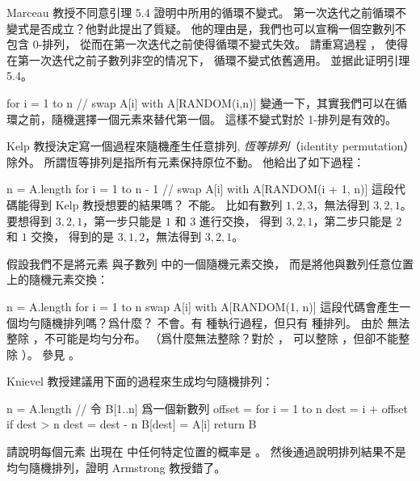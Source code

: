 \startsection[
  title={Randomized algorithms},
]

\startEXERCISE
Marceau 教授不同意引理 5.4 證明中所用的循環不變式。
第一次迭代之前循環不變式是否成立？他對此提出了質疑。
他的理由是，我們也可以宣稱一個空數列不包含 0-排列，
從而在第一次迭代之前使得循環不變式失效。
請重寫過程 ，
使得在第一次迭代之前子數列非空的情况下，
循環不變式依舊適用。
並据此证明引理 5.4。

\startCLRSCODE
for i = 1 to n
	// swap A[i] with A[RANDOM(i,n)]
\stopCLRSCODE
\stopEXERCISE
\startANSWER
變通一下，其實我們可以在循環之前，隨機選擇一個元素來替代第一個。
這樣不變式對於 1-排列是有效的。
\stopANSWER

\startEXERCISE
Kelp 教授決定寫一個過程來隨機產生任意排列,
\emph{恆等排列}（identity permutation）除外。
所謂恆等排列是指所有元素保持原位不動。
他給出了如下過程：

\startCLRSCODE
n = A.length
for i = 1 to n - 1
	// swap A[i] with A[RANDOM(i + 1, n)]
\stopCLRSCODE
這段代碼能得到 Kelp 教授想要的結果嗎？
\stopEXERCISE
\startANSWER
不能。
比如有數列 $1,2,3$，無法得到 $3,2,1$。
要想得到 $3,2,1$，第一步只能是 $1$ 和 $3$ 進行交換，
得到 $3,2,1$，第二步只能是 $2$ 和 $1$ 交換，
得到的是 $3,1,2$，無法得到 $3,2,1$。
\stopANSWER

\startEXERCISE
假設我們不是將元素  與子數列  中的一個隨機元素交換，
而是將他與數列任意位置上的隨機元素交換：

\startCLRSCODE
n = A.length
for i = 1 to n
	swap A[i] with A[RANDOM(1, n)]
\stopCLRSCODE
這段代碼會產生一個均勻隨機排列嗎？爲什麼？
\stopEXERCISE
\startANSWER
不會。有  種執行過程，但只有  種排列。
由於  無法整除 ，不可能是均勻分布。
（爲什麼無法整除？對於 ，  可以整除 ，但卻不能整除 ）。
參見 。
\stopANSWER

\startEXERCISE
Knievel 教授建議用下面的過程來生成均勻隨機排列：

\startCLRSCODE
n = A.length
// 令 B[1..n] 爲一個新數列
offset = 
for i = 1 to n
	dest = i + offset
	if dest > n
		dest = dest - n
	B[dest] = A[i]
return B
\stopCLRSCODE

請說明每個元素  出現在  中任何特定位置的概率是 。
然後通過說明排列結果不是均勻隨機排列，證明 Armstrong 教授錯了。
\stopEXERCISE

